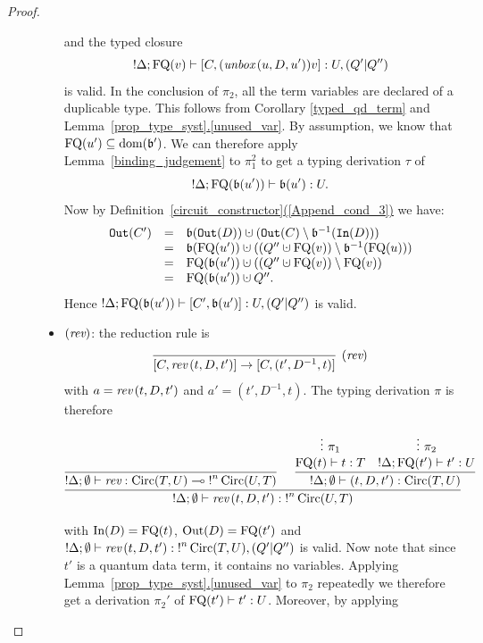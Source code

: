\documentclass[twoside]{article}
\begin{document}
\begin{proof}
\begin{description}
\begin{itemize}
  and the typed closure
  \[
  {!}\Delta; \mathop{\textrm{FQ}}\nolimits(v) \vdash [C,(\mathop{\textit{unbox}}\nolimits\,(u,D,u'))v] :U,(Q'|Q'')
  \] 
  is valid. In the conclusion of $\pi_2$, all the 
  term variables are declared of a duplicable type. This 
  follows from Corollary \ref{typed_qd_term} and 
  Lemma~\hyperref[unused_var]{\ref*{prop_type_syst}.\ref*{unused_var}}. 
  By assumption, we know that $\mathop{\textrm{FQ}}\nolimits(u')\subseteq\mathop{\textrm{\rm dom}}\nolimits(\mathfrak{b}')$. 
  We can therefore apply Lemma~\hyperref[binding_judgement]
  {\ref*{binding_judgement}} to $\pi_1^2$ to get a typing 
  derivation $\tau$ of 
  \[
  {!}\Delta;\mathop{\textrm{FQ}}\nolimits(\mathfrak{b}(u'))\vdash \mathfrak{b}(u'):U.
  \]
  Now by 
  Definition~\hyperref[Append_cond_3]{\ref*{circuit_constructor}(\ref*{Append_cond_3})} 
  we have:
  \[
  \begin{array}{rcl}
  \mathtt{Out}(C') & = & \binding(\mathtt{Out}(D))\cupdot (\mathtt{Out}(C)\setminus\binding^{-1}(\mathtt{In}(D))) \\
                   & = & \binding(\FQ(u')) \cupdot ((Q''\cupdot\FQ(v))\setminus \binding^{-1}(\FQ(u))) \\
                   & = & \FQ(\binding(u')) \cupdot ((Q''\cupdot\FQ(v))\setminus \FQ(v)) \\
                   & = & \FQ(\binding(u'))\cupdot Q''.                   
  \end{array}
  \]
  Hence ${!}\Delta; \mathop{\textrm{FQ}}\nolimits(\mathfrak{b}(u'))\vdash [C',\mathfrak{b}(u')] :U,(Q'|Q'')$  is valid.
  \item $(\mathop{\textit{rev}}\nolimits)$: the reduction rule is
  \[
    \infer[(\rev)]{[C,\rev\,(t,D,t')]\to [C,(t',D^{-1},t)]}{}
  \]
  with $a=\mathop{\textit{rev}}\nolimits\,(t,D,t')$ and $a'=(t',D^{-1},t)$. The typing derivation $\pi$ 
  is therefore
  \begin{footnotesize}
  \[
  \infer[]{{!}\Delta;\emptyset\entails \rev\,(t,D,t'):{!}^n\Circ(U,T)}{
    \infer[]{{!}\Delta;\emptyset \entails \rev:\Circ(T,U)\loli {!}^n\Circ(U,T)}{
    }   
    &
    \infer[]{{!}\Delta ;\emptyset\entails (t,D,t'):\Circ(T,U)}{
      \deduce[]{\FQ(t)\entails t:T}{
        \vdots ~\pi_1
      }
      &
      \deduce[]{{!}\Delta;\FQ(t')\entails t':U}{
        \vdots ~\pi_2     
      }
    }
  }
  \]
  \end{footnotesize}  
  with $\mathop{\textrm{In}}\nolimits(D)=\mathop{\textrm{FQ}}\nolimits(t)$, $\mathop{\textrm{Out}}\nolimits(D)=\mathop{\textrm{FQ}}\nolimits(t')$ and 
  ${!}\Delta;\emptyset\vdash \mathop{\textit{rev}}\nolimits\,(t,D,t'):{!}^n\mathop{\textrm{Circ}}\nolimits(T,U),(Q'|Q'')$ is 
  valid. Now note that since $t'$ is a quantum data term, it contains no variables. 
  Applying Lemma~\hyperref[unused_var]{\ref*{prop_type_syst}.\ref*{unused_var}} 
  to $\pi_2$ repeatedly we therefore get a derivation $\pi_2'$ of 
  $\mathop{\textrm{FQ}}\nolimits(t')\vdash t':U$. Moreover, by applying

\end{itemize}
\end{description}
\end{proof}
\end{document}
